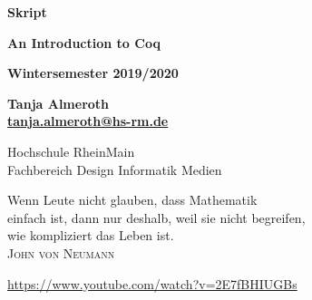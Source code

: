 \documentclass[11pt, a4paper, twoside, bibliography=totoc]{scrartcl}
\makeatletter
\newcommand{\docutyp}{Skript}
\newcommand{\lecture}{An Introduction to Coq}
\newcommand{\docudate}{Wintersemester 2019/2020}
\newcommand{\institution}{{\Large Hochschule RheinMain}\\
                          Fachbereich Design Informatik Medien}
\newcommand{\lecturer}{Tanja Almeroth}
\newcommand{\lectureremail}{\href{mailto:tanja.almeroth@hs-rm.de}{tanja.almeroth@hs-rm.de}}
\makeatother
\begin{document}
\pagestyle{scrplain}

\begin{titlepage}

	\vspace{40pt}
	\begin{center}

                
		\vspace{20pt}
		\textbf{\Large {\docutyp}}
			
		\vspace{20pt}
		\textbf{\Huge \lecture}
			
		\vspace{20pt}
		\textbf{\docudate}

		\vspace{20pt}
		\textbf{\lecturer}\\
		\textbf{\lectureremail}
		
		\vspace{120pt}
		{\institution}\\
		
		\vfill			
		\vspace{20pt}
		
	\end{center}
	\newpage
\end{titlepage}

\cleardoublepage

\vspace{0.3\textheight} 
\begin{raggedleft}
Wenn Leute nicht glauben, dass Mathematik\\
einfach ist, dann nur deshalb, weil sie nicht begreifen,\\
wie kompliziert das Leben ist.\\[\smallskipamount]
\hfill \textsc{John von Neumann}%
\end{raggedleft}
\vspace*{1.5cm}



\vspace*{1.5cm}
%
\begin{raggedleft}
\url{https://www.youtube.com/watch?v=2E7fBHIUGBs}\\[\smallskipamount]
\end{raggedleft}

\vfill



\cleardoublepage

\tableofcontents

\cleardoublepage

\pagestyle{scrheadings}
\end{document}

